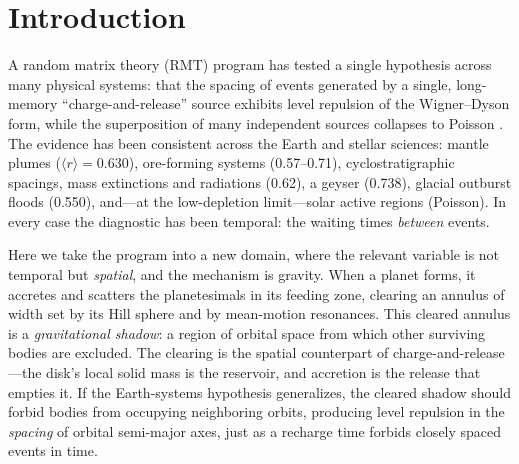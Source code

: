 \documentclass[12pt,a4paper]{article}
\begin{document}
\begin{abstract}
\vspace{0.8em}
\noindent\textbf{Keywords:} random matrix theory; level repulsion; orbital architecture; exoplanets; Kepler; gravitational clearing; Hill sphere; dynamical packing; Titius--Bode; spectral superposition

\vspace{0.4em}
\noindent\textbf{Code and data:} \url{https://github.com/Ruqing1963/orbital-rmt-gravitational-shadow}

\vspace{0.2em}
\noindent\textbf{Companion studies:} stratigraphy \url{https://zenodo.org/records/20774581}; seismotectonics \url{https://zenodo.org/records/20768130}; mantle plumes \url{https://zenodo.org/records/20768420}; metallogeny \url{https://zenodo.org/records/20768849}; evolution \url{https://zenodo.org/records/20783763}; hydrogeology \url{https://zenodo.org/records/20780389}; solar flares \url{https://zenodo.org/records/20784967}
\end{abstract}

\section{Introduction}

A random matrix theory (RMT) program has tested a single hypothesis across many physical systems: that the spacing of events generated by a single, long-memory ``charge-and-release'' source exhibits level repulsion of the Wigner--Dyson form, while the superposition of many independent sources collapses to Poisson \citep{chen2026plume,chen2026metal,chen2026strat,chen2026evo,chen2026hydro,chen2026solar}. The evidence has been consistent across the Earth and stellar sciences: mantle plumes ($\langle r\rangle=0.630$), ore-forming systems (0.57--0.71), cyclostratigraphic spacings, mass extinctions and radiations (0.62), a geyser (0.738), glacial outburst floods (0.550), and---at the low-depletion limit---solar active regions (Poisson). In every case the diagnostic has been temporal: the waiting times \emph{between} events.

Here we take the program into a new domain, where the relevant variable is not temporal but \emph{spatial}, and the mechanism is gravity. When a planet forms, it accretes and scatters the planetesimals in its feeding zone, clearing an annulus of width set by its Hill sphere and by mean-motion resonances. This cleared annulus is a \emph{gravitational shadow}: a region of orbital space from which other surviving bodies are excluded. The clearing is the spatial counterpart of charge-and-release---the disk's local solid mass is the reservoir, and accretion is the release that empties it. If the Earth-systems hypothesis generalizes, the cleared shadow should forbid bodies from occupying neighboring orbits, producing level repulsion in the \emph{spacing} of orbital semi-major axes, just as a recharge time forbids closely spaced events in time.
\end{document}
